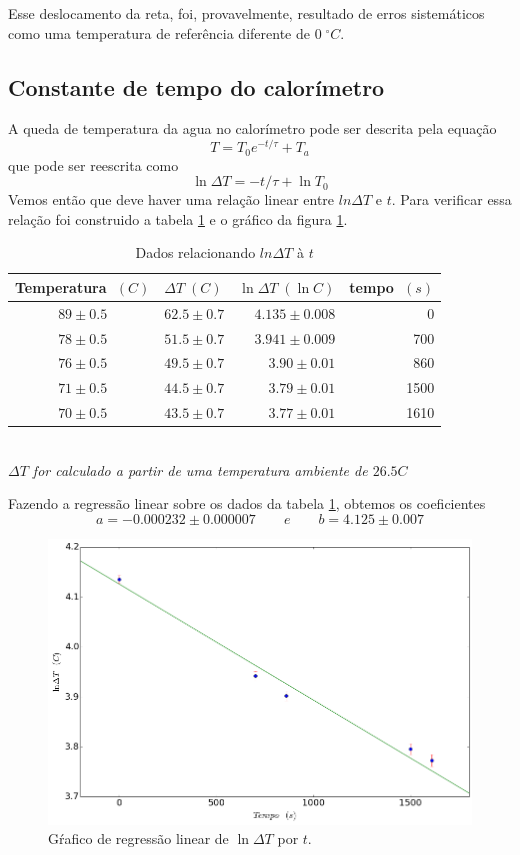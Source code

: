 \documentclass[12pt,a4paper]{article}
\begin{document}
Esse deslocamento da reta, foi, provavelmente, resultado de erros sistemáticos como uma temperatura de referência diferente de $0 \; ^{\circ} C$.

\subsection{Constante de tempo do calorímetro}
A queda de temperatura da agua no calorímetro pode ser descrita pela equação
$$ T = T_0 e^{-t/\tau} + T_a $$
que pode ser reescrita como
$$ \ln \Delta T = -t/\tau + \ln T_0 $$
Vemos então que deve haver uma relação linear entre $ln \Delta T$ e $ t $. Para verificar essa relação foi construido a tabela \ref{table:tempo} e o gráfico da figura \ref{fig:tempo}. \\
\begin{table}[!htbp]
\centering
\def\arraystretch{1.5}
\caption{Dados relacionando $ln \Delta T$ à $t$}
\label{table:tempo}
\begin{tabular}{|c|l|r|r|}
\hline
Temperatura $\; (C)$ & $\Delta T \; (C)$ & $\ln \Delta T \; (\ln C)$ & tempo $\; (s)$ \\
\hline
 $89 \pm 0.5$ & $ 62.5 \pm  0.7 $ & $ 4.135 \pm 0.008 $    &    0 \\
 \hline
 $78 \pm 0.5$ & $ 51.5 \pm  0.7 $ & $ 3.941 \pm 0.009 $ &  700 \\
 \hline
 $76 \pm 0.5 $& $ 49.5 \pm  0.7 $ & $ 3.90 \pm 0.01 $ &  860 \\
 \hline
 $71 \pm 0.5$ & $ 44.5 \pm  0.7 $ & $ 3.79 \pm 0.01 $ & 1500 \\
 \hline
 $70 \pm 0.5$& $ 43.5 \pm  0.7 $ & $ 3.77 \pm 0.01 $ & 1610 \\
\hline
\end{tabular}\\
\emph{$\Delta T$ for calculado a partir de uma temperatura ambiente de $26.5 C$}

\end{table}
Fazendo a regressão linear sobre os dados da tabela \ref{table:tempo}, obtemos os coeficientes 
$$ a = -0.000232 \pm 0.000007\qquad e\qquad b = 4.125 \pm 0.007 $$

\begin{figure}[!htbp]
\includegraphics[scale=0.55]{tempo.png}
\caption{Gŕafico de regressão linear de $ \ln \Delta T$ por $t$.}
\label{fig:tempo}
\end{figure}
\end{document}
